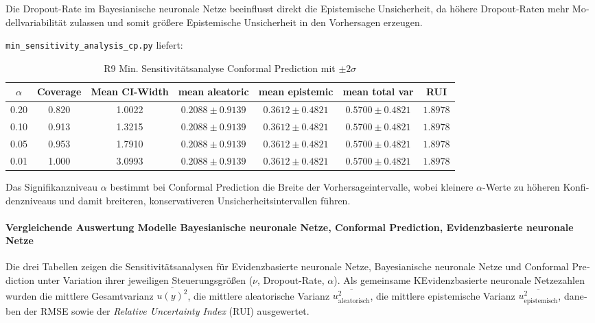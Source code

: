 \begin{otherlanguage}{ngerman}
Die Dropout-Rate im \gls{Bayesianische neuronale Netze} beeinflusst direkt die \gls{Epistemische Unsicherheit}, da höhere Dropout-Raten mehr Modellvariabilität zulassen und somit größere \gls{Epistemische Unsicherheit} in den Vorhersagen erzeugen.

\newline
\texttt{min\_sensitivity\_analysis\_cp.py} liefert:

\begin{table}[!htbp]
\centering
\footnotesize
\begin{tabular}{|c|c|c|c|c|c|c|}
\hline
$\alpha$ 
& Coverage 
& Mean CI-Width 
& mean aleatoric 
& mean epistemic 
& mean total var 
& RUI \\
\hline
0.20 & 0.820 & 1.0022 & $0.2088 \pm 0.9139$ & $0.3612 \pm 0.4821$ & $0.5700 \pm 0.4821$ & $1.8978$ \\
\hline
0.10 & 0.913 & 1.3215 & $0.2088 \pm 0.9139$ & $0.3612 \pm 0.4821$ & $0.5700 \pm 0.4821$ & $1.8978$ \\
\hline
0.05 & 0.953 & 1.7910 & $0.2088 \pm 0.9139$ & $0.3612 \pm 0.4821$ & $0.5700 \pm 0.4821$ & $1.8978$ \\
\hline
0.01 & 1.000 & 3.0993 & $0.2088 \pm 0.9139$ & $0.3612 \pm 0.4821$ & $0.5700 \pm 0.4821$ & $1.8978$ \\
\hline
\end{tabular}
\caption{R9 Min. Sensitivitätsanalyse \gls{Conformal Prediction} mit $\pm 2\sigma$}
\label{tab:cp_results}
\end{table}

Das Signifikanzniveau $\alpha$ bestimmt bei \gls{Conformal Prediction} die Breite der Vorhersageintervalle, wobei kleinere $\alpha$-Werte zu höheren Konfidenzniveaus und damit breiteren, konservativeren Unsicherheitsintervallen führen.



\paragraph{Vergleichende Auswertung Modelle \gls{Bayesianische neuronale Netze}, \gls{Conformal Prediction}, \gls{Evidenzbasierte neuronale Netze}}

Die drei Tabellen zeigen die Sensitivitätsanalysen für \gls{Evidenzbasierte neuronale Netze}, \gls{Bayesianische neuronale Netze} und \gls{Conformal Prediction} unter Variation ihrer jeweiligen Steuerungsgrößen (\(\nu\), Dropout-Rate, \(\alpha\)). Als gemeinsame K\gls{Evidenzbasierte neuronale Netze}zahlen wurden die mittlere Gesamtvarianz \(\overline{u(y)^2}\), die mittlere aleatorische Varianz \(\overline{u_{\text{aleatorisch}}^2}\), die mittlere epistemische Varianz \(\overline{u_{\text{epistemisch}}^2}\), daneben der RMSE sowie der \emph{Relative Uncertainty Index} (RUI) ausgewertet.  


\end{otherlanguage}
